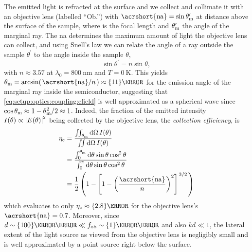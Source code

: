 The emitted light is refracted at the surface and we collect and collimate it with an objective lens (labelled \enquote{Ob.}) with $\mr{\acrshort{na}}=\sin\theta^\prime_\mr{m}$ at distance \fob above the surface of the sample, where \fob is the focal length and $\theta^\prime_{\mathrm{m}}$ the angle of the marginal ray.
The \gls{na} determines the maximum amount of light the objective lens can collect, and using Snell's law we can relate the angle of a ray outside the sample $\theta^\prime$ to the angle inside the sample $\theta$,
\begin{equation}\label{eq:setup:optics:coupling:snell}
    \sin\theta^\prime = n\sin\theta,
\end{equation}
with $n\approx 3.57$ at $\lambda_0=\qty{800}{\nano\meter}$ and $T=\qty{0}{\kelvin}$.
This yields $\theta_{\mr{m}} = \arcsin(\flatfrac{\mr{\acrshort{na}}}{n}) \approx\qty{11}{\degree}$ for the emission angle of the marginal ray inside the semiconductor, suggesting that \cref{eq:setup:optics:coupling:efield} is well approximated as a spherical wave since $\cos\theta_{\mathrm{m}}\approx 1-\theta_{\mathrm{m}}^2/2\approx 1$.
Indeed, the fraction of the emitted intensity $I(\theta)\propto\abs{E(\theta)}^2$ being collected by the objective lens, the \emph{collection efficiency}, is
\begin{equation}\label{eq:setup:optics:coupling:efficiency:collection}
\begin{split}
    \eta_{\mr{c}} &= \frac{\iint_{\theta_{\mr{m}}}\dd{\Omega} I(\theta)}{\iint\dd{\Omega} I(\theta)} \\
                  &= \frac{\int_{0}^{\theta_{\mr{m}}}\dd{\theta}\sin\theta\cos^2\theta}{\int_{0}^{\pi}\dd{\theta}\sin\theta\cos^2\theta} \\
                  &= \frac{1}{2}\left(1 - \left[1 - \left(\frac{\mr{\acrshort{na}}}{n}\right)^2\right]^{\flatfrac{3}{2}}\right)
\end{split}
\end{equation}
which evaluates to only $\eta_{\mr{c}}\approx\qty{2.8}{\percent}$ for the objective lens's $\mr{\acrshort{na}}=\num{0.7}$.
Moreover, since $d\sim\qty{100}{\nano\meter}\ll\fob\sim\qty{1}{\milli\meter}$ and also $kd\ll 1$, the lateral extent of the light source as viewed from the objective lens is negligibly small and is well approximated by a point source right below the surface.


